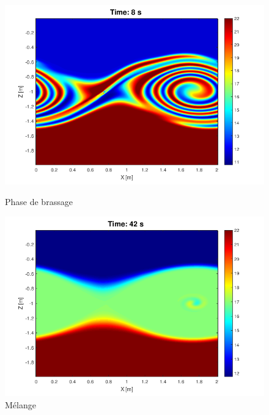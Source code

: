 \documentclass{rapportECC}
\begin{document}
\begin{figure}[htbp]
    \begin{minipage}{0.45\textwidth}
        \centering
        \includegraphics[width=\linewidth]{images/KHI3.png}
        \caption{Phase de brassage}
        \label{fig:KHI3}
    \end{minipage}
    \hspace{0.05\textwidth} %
    \begin{minipage}{0.45\textwidth}
        \centering
        \includegraphics[width=\linewidth]{images/KHI4.png}
        \caption{Mélange}
        \label{fig:KHI4}
    \end{minipage}
\end{figure}
\end{document}
